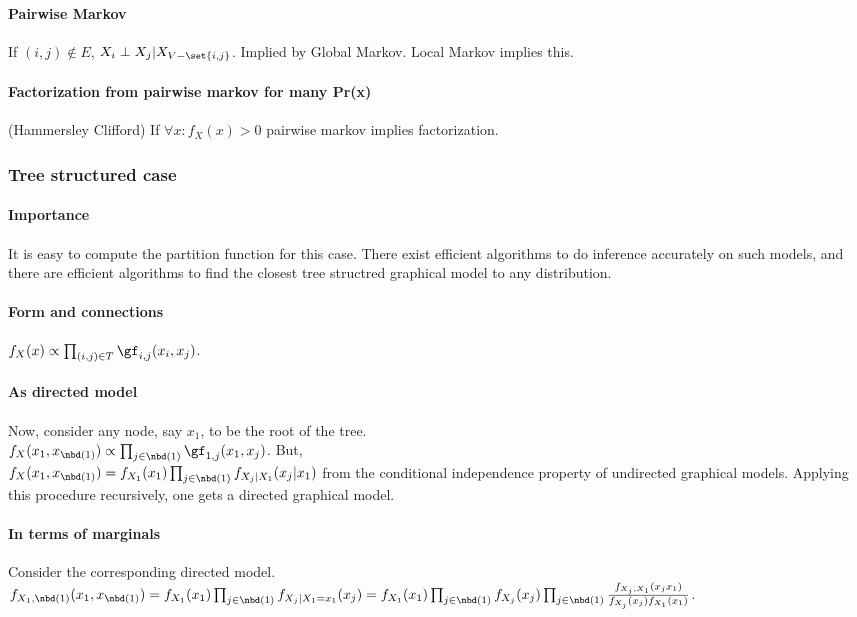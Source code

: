 \documentclass[oneside, article]{memoir}
\begin{document}
\paragraph*{Pairwise Markov}
If $(i, j) \notin E$, $X_i \perp X_j | X_{V-\set{i, j}} $. Implied by Global Markov. Local Markov implies this.

\paragraph*{Factorization from pairwise markov for many Pr(x)}
(Hammersley Clifford) If $\forall x: f_X(x) > 0$ pairwise markov implies factorization.

\subsubsection{Tree structured case}
\paragraph{Importance}
It is easy to compute the partition function for this case. There exist efficient algorithms to do inference accurately on such models, and there are efficient algorithms to find the closest tree structred graphical model to any distribution.

\paragraph{Form and connections}
$f_X(x) \propto \prod_{(i, j) \in T} \gf_{i,j}(x_i, x_j)$.

\paragraph{As directed model}
Now, consider any node, say $x_1$, to be the root of the tree. \\$f_X(x_1, x_{\nbd(1)}) \propto \prod_{j \in \nbd(1)} \gf_{1, j}(x_1, x_j)$. But, \\$f_X(x_1, x_{\nbd(1)}) = f_{X_1}(x_1) \prod_{j \in \nbd(1)} f_{X_j|X_1}(x_j|x_1)$ from the conditional independence property of undirected graphical models. Applying this procedure recursively, one gets a directed graphical model.

\paragraph{In terms of marginals}
Consider the corresponding directed model. \\
$f_{X_1,\nbd(1)}(x_1, x_{\nbd(1)}) = f_{X_1}(x_1) \prod_{j \in \nbd(1)} f_{X_j|X_1 = x_1}(x_j) \\= f_{X_1}(x_1) \prod_{j \in \nbd(1)} f_{X_j}(x_j) \prod_{j \in \nbd(1)} \frac{f_{X_j, X_1}(x_j x_1)}{f_{X_j}(x_j)f_{X_1}(x_1)}$.
\end{document}
